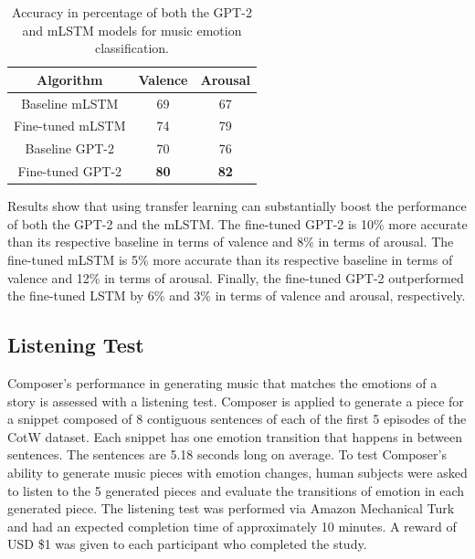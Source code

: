 \begin{table}[h!]
    \centering
    \begin{tabular}{ccc}
    \toprule
    \textbf{Algorithm} & \textbf{Valence} & \textbf{Arousal} \\
    \midrule
    Baseline mLSTM & 69 & 67 \\
    Fine-tuned mLSTM & 74 & 79 \\
    Baseline GPT-2 & 70 & 76 \\
    Fine-tuned GPT-2 & \textbf{80} & \textbf{82} \\
    \bottomrule
    \end{tabular}
    \caption{Accuracy in percentage of both the GPT-2 and mLSTM models for music emotion classification. }
    \label{tab:sent_accuracy}
\end{table}

Results show that using transfer learning can substantially boost the performance of both the GPT-2 and the mLSTM. The fine-tuned GPT-2 is 10\% more accurate than its respective baseline in terms of valence and 8\% in terms of arousal. The fine-tuned mLSTM is 5\% more accurate than its respective baseline in terms of valence and 12\% in terms of arousal. Finally, the fine-tuned GPT-2 outperformed the fine-tuned LSTM by 6\% and 3\% in terms of valence and arousal, respectively.

\subsection{Listening Test}

Composer's performance in generating music that matches the emotions of a story is assessed with a listening test. Composer is applied to generate a piece for a snippet composed of 8 contiguous sentences of each of the first 5 episodes of the CotW dataset. Each snippet has one emotion transition that happens in between sentences. The sentences are 5.18 seconds long on average. To test Composer's ability to generate music pieces with emotion changes, human subjects were asked to listen to the 5 generated pieces and evaluate the transitions of emotion in each generated piece. The listening test was performed via Amazon Mechanical Turk and had an expected completion time of approximately 10 minutes. A reward of USD \$1 was given to each participant who completed the study.

